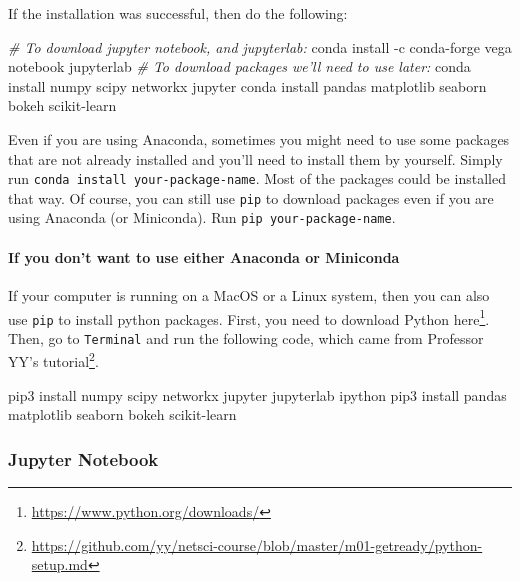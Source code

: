 \documentclass[
]{krantz}
\makeatletter
\newenvironment{Shaded}{\begin{snugshade}}{\end{snugshade}}
\newcommand{\CommentTok}[1]{\textcolor[rgb]{0.37,0.37,0.37}{\textit{#1}}}
\newcommand{\ExtensionTok}[1]{#1}
\newcommand{\NormalTok}[1]{#1}
\renewcommand{\href}[2]{#2\footnote{\url{#1}}}
\newenvironment{kframe}{%
\medskip{}
\setlength{\fboxsep}{.8em}
 \def\at@end@of@kframe{}%
 \ifinner\ifhmode%
  \def\at@end@of@kframe{\end{minipage}}%
  \begin{minipage}{\columnwidth}%
 \fi\fi%
 \def\FrameCommand##1{\hskip\@totalleftmargin \hskip-\fboxsep
 \colorbox{shadecolor}{##1}\hskip-\fboxsep
     \hskip-\linewidth \hskip-\@totalleftmargin \hskip\columnwidth}%
 \MakeFramed {\advance\hsize-\width
   \@totalleftmargin\z@ \linewidth\hsize
   \@setminipage}}%
 {\par\unskip\endMakeFramed%
 \at@end@of@kframe}
\renewenvironment{Shaded}{\begin{kframe}}{\end{kframe}}
\makeatother
\begin{document}
If the installation was successful, then do the following:

\begin{Shaded}
\begin{Highlighting}[]
\CommentTok{# To download jupyter notebook, and jupyterlab:}
\ExtensionTok{conda}\NormalTok{ install -c conda-forge vega notebook jupyterlab }
\CommentTok{# To download packages we'll need to use later:}
\ExtensionTok{conda}\NormalTok{ install numpy scipy networkx jupyter }
\ExtensionTok{conda}\NormalTok{ install pandas matplotlib seaborn bokeh scikit-learn }
\end{Highlighting}
\end{Shaded}

Even if you are using Anaconda, sometimes you might need to use some packages that are not already installed and you'll need to install them by yourself. Simply run \texttt{conda\ install\ your-package-name}. Most of the packages could be installed that way. Of course, you can still use \texttt{pip} to download packages even if you are using Anaconda (or Miniconda). Run \texttt{pip\ your-package-name}.

\hypertarget{if-you-dont-want-to-use-either-anaconda-or-miniconda}{%
\paragraph{If you don't want to use either Anaconda or Miniconda}\label{if-you-dont-want-to-use-either-anaconda-or-miniconda}}

If your computer is running on a MacOS or a Linux system, then you can also use \texttt{pip} to install python packages. First, you need to download Python \href{https://www.python.org/downloads/}{here}. Then, go to \texttt{Terminal} and run the following code, which came from \href{https://github.com/yy/netsci-course/blob/master/m01-getready/python-setup.md}{Professor YY's tutorial}.

\begin{Shaded}
\begin{Highlighting}[]
\ExtensionTok{pip3}\NormalTok{ install numpy scipy networkx jupyter jupyterlab ipython }
\ExtensionTok{pip3}\NormalTok{ install pandas matplotlib seaborn bokeh scikit-learn}
\end{Highlighting}
\end{Shaded}

\hypertarget{jupyter-notebook}{%
\subsubsection{Jupyter Notebook}\label{jupyter-notebook}}
\end{document}
